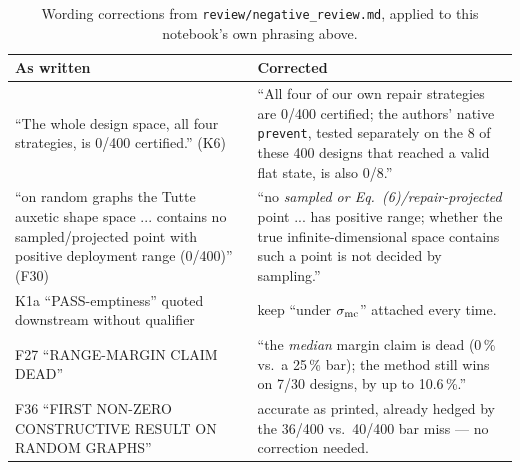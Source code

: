 \documentclass[10pt,a4paper]{article}
\newcommand{\fn}[1]{\nolinkurl{#1}}
\begin{document}
\begin{table}[h]\centering\small
\begin{tabular}{@{}p{58mm}p{75mm}@{}}
\toprule
As written & Corrected \\
\midrule
``The whole design space, all four strategies, is 0/400 certified.'' (K6) & ``All four of our own
repair strategies are 0/400 certified; the authors' native \fn{prevent}, tested separately on the
8 of these 400 designs that reached a valid flat state, is also 0/8.'' \\
``on random graphs the Tutte auxetic shape space ... contains no sampled/projected point with
positive deployment range (0/400)'' (F30) & ``no \emph{sampled or Eq.~(6)/repair-projected} point
... has positive range; whether the true infinite-dimensional space contains such a point is not
decided by sampling.'' \\
K1a ``PASS-emptiness'' quoted downstream without qualifier & keep ``under $\sigma_{\rm mc}$''
attached every time. \\
F27 ``RANGE-MARGIN CLAIM DEAD'' & ``the \emph{median} margin claim is dead (0\,\% vs.\ a 25\,\%
bar); the method still wins on 7/30 designs, by up to 10.6\,\%.'' \\
F36 ``FIRST NON-ZERO CONSTRUCTIVE RESULT ON RANDOM GRAPHS'' & accurate as printed, already hedged
by the 36/400 vs.\ 40/400 bar miss --- no correction needed. \\
\bottomrule
\end{tabular}
\caption{Wording corrections from \fn{review/negative\_review.md}, applied to this notebook's own
phrasing above.}
\label{tab:day3-wording}
\end{table}
\end{document}
